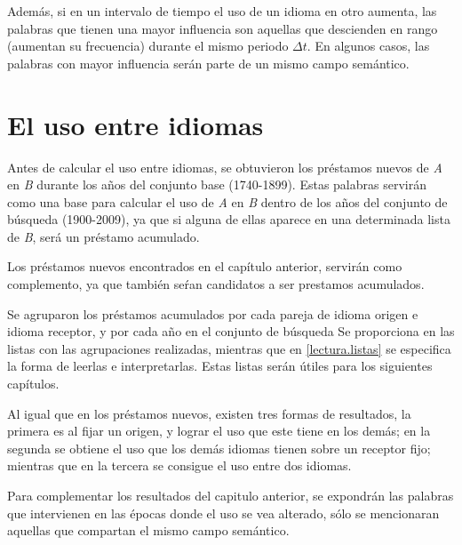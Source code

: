 Además, si en un intervalo de tiempo el uso de un idioma en otro aumenta, las palabras que tienen una mayor influencia son aquellas que descienden en rango (aumentan su frecuencia) durante el mismo periodo $\Delta t$. En algunos casos, las palabras con mayor influencia serán parte de un mismo campo semántico. 


\section {El uso entre idiomas} 

Antes de calcular el uso entre idiomas, se obtuvieron los préstamos nuevos de \textit{A} en \textit{B} durante los años del conjunto base (1740-1899).
Estas palabras servirán como una base para calcular el uso de \textit{A} en \textit{B} dentro de los años del conjunto de búsqueda (1900-2009), ya que si alguna de ellas aparece en una determinada lista de \textit{B}, será un préstamo acumulado. 

Los préstamos nuevos encontrados en el capítulo anterior, servirán como complemento, ya que también seŕan candidatos a ser prestamos acumulados.

Se agruparon los préstamos acumulados por cada pareja de idioma origen e idioma receptor, y por cada año en el conjunto de búsqueda  Se proporciona en \cite{prestamos_acumulados} las listas con las agrupaciones realizadas, mientras que en \ref{lectura.listas} se especifica la forma de leerlas e interpretarlas. Estas listas serán útiles para los siguientes capítulos. 

Al igual que en los préstamos nuevos, existen tres formas de resultados,  la primera es al fijar un origen,  y lograr el uso que este tiene en los demás; en la segunda se obtiene el uso que los demás idiomas tienen sobre un receptor fijo;  mientras que en la tercera se consigue el uso entre dos idiomas. 


Para complementar los resultados del capitulo anterior, se expondrán las palabras que intervienen en las épocas donde el uso se vea alterado, sólo se mencionaran aquellas que compartan el mismo campo semántico. 

